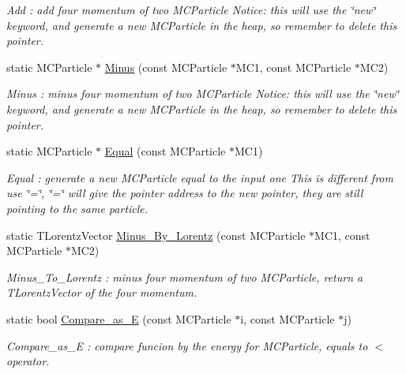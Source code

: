 \begin{DoxyCompactItemize}
\begin{DoxyCompactList}\small\item\em Add : add four momentum of two MCParticle Notice: this will use the \char`\"{}new\char`\"{} keyword, and generate a new MCParticle in the heap, so remember to delete this pointer. \item\end{DoxyCompactList}\item 
static MCParticle $\ast$ \hyperlink{classToolSet_1_1CMC_aa597db31bacbc37cbc16da5bfe2b1d9a}{Minus} (const MCParticle $\ast$MC1, const MCParticle $\ast$MC2)
\begin{DoxyCompactList}\small\item\em Minus : minus four momentum of two MCParticle Notice: this will use the \char`\"{}new\char`\"{} keyword, and generate a new MCParticle in the heap, so remember to delete this pointer. \item\end{DoxyCompactList}\item 
static MCParticle $\ast$ \hyperlink{classToolSet_1_1CMC_a29838e430204b6f0d6e5cdf8a669f615}{Equal} (const MCParticle $\ast$MC1)
\begin{DoxyCompactList}\small\item\em Equal : generate a new MCParticle equal to the input one This is different from use \char`\"{}=\char`\"{}, \char`\"{}=\char`\"{} will give the pointer address to the new pointer, they are still pointing to the same particle. \item\end{DoxyCompactList}\item 
static TLorentzVector \hyperlink{classToolSet_1_1CMC_a5883ceda367cc5e32cbacdabdc119a4a}{Minus\_\-By\_\-Lorentz} (const MCParticle $\ast$MC1, const MCParticle $\ast$MC2)
\begin{DoxyCompactList}\small\item\em Minus\_\-To\_\-Lorentz : minus four momentum of two MCParticle, return a TLorentzVector of the four momentum. \item\end{DoxyCompactList}\item 
static bool \hyperlink{classToolSet_1_1CMC_a74a827b8a208cbf1ef83ee66b2a9dc04}{Compare\_\-as\_\-E} (const MCParticle $\ast$i, const MCParticle $\ast$j)
\begin{DoxyCompactList}\small\item\em Compare\_\-as\_\-E : compare funcion by the energy for MCParticle, equals to $<$ operator. \item\end{DoxyCompactList}\item 

\end{DoxyCompactItemize}

